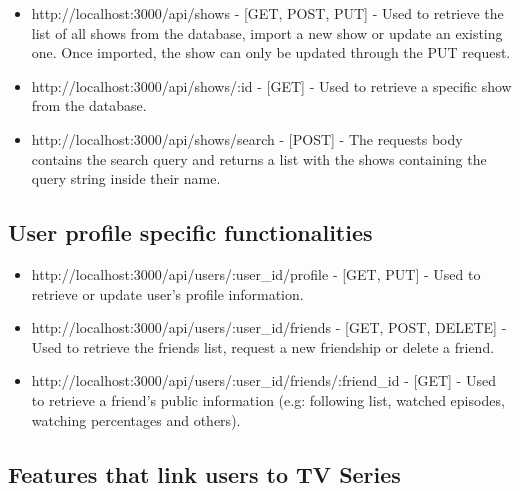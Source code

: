 \begin{itemize}
    \item http://localhost:3000/api/shows - [GET, POST, PUT] - Used to retrieve the list of all shows from the database, import a new show or update an existing one. Once imported, the show can only be updated through the PUT request.
    \item http://localhost:3000/api/shows/:id - [GET] - Used to retrieve a specific show from the database.
    \item http://localhost:3000/api/shows/search - [POST] - The requests body contains the search query and returns a list with the shows containing the query string inside their name.
\end{itemize}

\subsection{User profile specific functionalities}

\begin{itemize}
    \item http://localhost:3000/api/users/:user\_id/profile -
    [GET, PUT] - Used to retrieve or update user's profile information.
    \item http://localhost:3000/api/users/:user\_id/friends - [GET, POST, DELETE] - Used to retrieve the friends list, request a new friendship or delete a friend.
    \item http://localhost:3000/api/users/:user\_id/friends/:friend\_id - [GET] - Used to retrieve a friend's public information (e.g: following list, watched episodes, watching percentages and others).
\end{itemize}

\subsection{Features that link users to TV Series}

